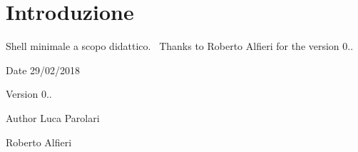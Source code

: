 \hypertarget{index_intro}{}\section{Introduzione}\label{index_intro}
Shell minimale a scopo didattico.~\newline
Thanks to Roberto Alfieri for the version 0..

\begin{DoxyDate}{Date}
29/02/2018 
\end{DoxyDate}
\begin{DoxyVersion}{Version}
0.. 
\end{DoxyVersion}
\begin{DoxyAuthor}{Author}
Luca Parolari 

Roberto Alfieri 
\end{DoxyAuthor}
